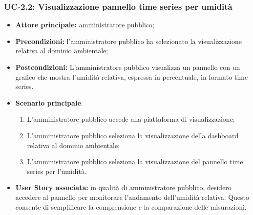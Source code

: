\documentclass[8pt]{article}
\begin{document}
\subsubsection*{UC-2.2: Visualizzazione pannello time series per umidità}
\begin{itemize}
    \item \textbf{Attore principale:} amministratore pubblico;
    \item \textbf{Precondizioni: }l’amministratore pubblico ha selezionato la visualizzazione
        relativa al dominio ambientale;
    \item \textbf{Postcondizioni:} L’amministratore pubblico visualizza un pannello con un grafico
        che mostra l'umidità relativa, espressa in percentuale, in formato time series.
    \item \textbf{Scenario principale}:
    \begin{enumerate}
    \item L’amministratore pubblico accede alla piattaforma di visualizzazione;
    \item L’amministratore pubblico seleziona la visualizzazione della dashboard relativa al dominio
        ambientale; 
    \item L’amministratore pubblico seleziona la visualizzazione del pannello time series per
        l'umidità.
    \end{enumerate}
\item \textbf{User Story associata:} in qualità di amministratore pubblico, desidero accedere al
        pannello per monitorare l'andamento dell'umidità relativa. Questo consente di semplificare la comprensione e la comparazione delle misurazioni.
\end{itemize}
\end{document}
